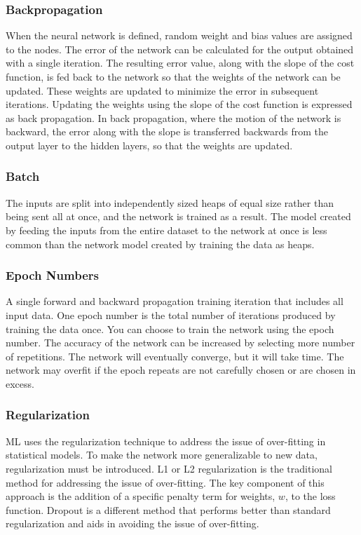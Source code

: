 \documentclass[12pt,twoside,a4]{mwbk}
\begin{document}
\subsubsection{Backpropagation}
When the neural network is defined, random weight and bias values are assigned to the nodes. The error of the network can be calculated for the output obtained with a single iteration. The resulting error value, along with the slope of the cost function, is fed back to the network so that the weights of the network can be updated. These weights are updated to minimize the error in subsequent iterations. Updating the weights using the slope of the cost function is expressed as back propagation. In back propagation, where the motion of the network is backward, the error along with the slope is transferred backwards from the output layer to the hidden layers, so that the weights are updated.

\subsubsection{Batch}
The inputs are split into independently sized heaps of equal size rather than being sent all at once, and the network is trained as a result. The model created by feeding the inputs from the entire dataset to the network at once is less common than the network model created by training the data as heaps.

\subsubsection{Epoch Numbers}
A single forward and backward propagation training iteration that includes all input data. One epoch number is the total number of iterations produced by training the data once. You can choose to train the network using the epoch number. The accuracy of the network can be increased by selecting more number of repetitions. The network will eventually converge, but it will take time. The network may overfit if the epoch repeats are not carefully chosen or are chosen in excess. 

\subsubsection{Regularization}
ML uses the regularization technique to address the issue of over-fitting in statistical models. To make the network more generalizable to new data, regularization must be introduced. L1 or L2 regularization is the traditional method for addressing the issue of over-fitting. The key component of this approach is the addition of a specific penalty term for weights, $w$, to the loss function. Dropout is a different method that performs better than standard regularization and aids in avoiding the issue of over-fitting.
\end{document}
